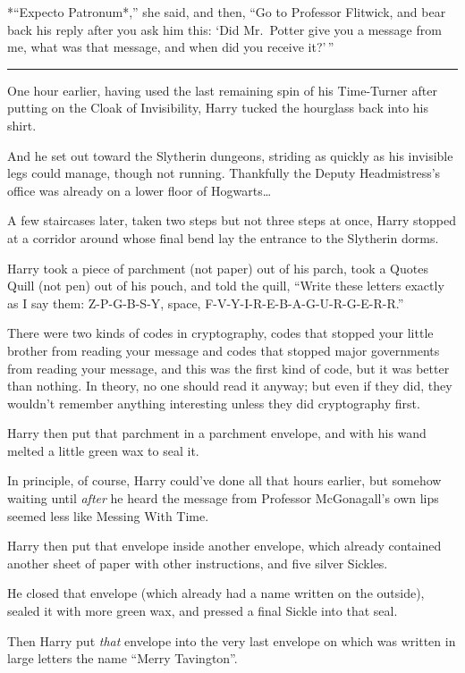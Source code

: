 *``Expecto Patronum*,'' she said, and then, ``Go to Professor Flitwick,
and bear back his reply after you ask him this: `Did Mr.~Potter give you
a message from me, what was that message, and when did you receive
it?'\,''

\begin{center}\rule{3in}{0.4pt}\end{center}

One hour earlier, having used the last remaining spin of his Time-Turner
after putting on the Cloak of Invisibility, Harry tucked the hourglass
back into his shirt.

And he set out toward the Slytherin dungeons, striding as quickly as his
invisible legs could manage, though not running. Thankfully the Deputy
Headmistress's office was already on a lower floor of Hogwarts\ldots{}

A few staircases later, taken two steps but not three steps at once,
Harry stopped at a corridor around whose final bend lay the entrance to
the Slytherin dorms.

Harry took a piece of parchment (not paper) out of his parch, took a
Quotes Quill (not pen) out of his pouch, and told the quill, ``Write
these letters exactly as I say them: Z-P-G-B-S-Y, space,
F-V-Y-I-R-E-B-A-G-U-R-G-E-R-R.''

There were two kinds of codes in cryptography, codes that stopped your
little brother from reading your message and codes that stopped major
governments from reading your message, and this was the first kind of
code, but it was better than nothing. In theory, no one should read it
anyway; but even if they did, they wouldn't remember anything
interesting unless they did cryptography first.

Harry then put that parchment in a parchment envelope, and with his wand
melted a little green wax to seal it.

In principle, of course, Harry could've done all that hours earlier, but
somehow waiting until \emph{after} he heard the message from Professor
McGonagall's own lips seemed less like Messing With Time.

Harry then put that envelope inside another envelope, which already
contained another sheet of paper with other instructions, and five
silver Sickles.

He closed that envelope (which already had a name written on the
outside), sealed it with more green wax, and pressed a final Sickle into
that seal.

Then Harry put \emph{that} envelope into the very last envelope on which
was written in large letters the name ``Merry Tavington''.

